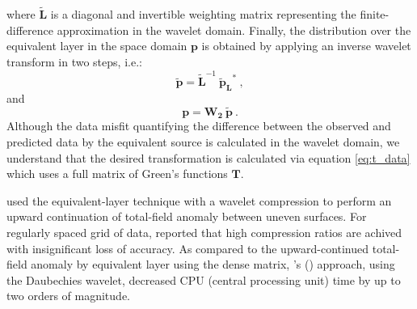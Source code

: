 where $\mathbf{\tilde{L}}$ is a diagonal and invertible weighting matrix representing the finite-difference approximation in the wavelet domain. 
Finally, the distribution over the equivalent layer in the space domain $\mathbf{p}$ is obtained by applying an inverse wavelet transform in two steps, i.e.:
\begin{equation}
	\mathbf{\tilde{p}}  = \mathbf{\tilde{L}}^{-1} \:  \mathbf{\tilde{p}_{L}}^{\ast} \:,
	\label{eq:ptil_li_oldenburg}
\end{equation}
and
\begin{equation}
	 \mathbf{p}  = \mathbf{W_2} \: \mathbf{\tilde{p}} \:.
	\label{eq:p_li_oldenburg}
\end{equation}
Although the data misfit quantifying the difference between the observed and  predicted data 
by the equivalent source is calculated in the wavelet domain, we understand that the desired transformation
is calculated via equation \ref{eq:t_data} which  uses a full matrix of Green's functions $\mathbf{T}$.

\cite{li-oldenburg2010} used the equivalent-layer technique with a wavelet compression to perform 
an  upward continuation of total-field anomaly between uneven surfaces.
For regularly spaced grid of data,  \cite{li-oldenburg2010} reported that high compression ratios 
are achived with insignificant loss of accuracy.
As compared to the upward-continued total-field anomaly by equivalent layer using the dense matrix,
\citeauthor{li-oldenburg2010}'s (\citeyear{li-oldenburg2010}) approach, using the Daubechies wavelet,
decreased CPU (central processing unit) time by up to two orders of magnitude.

